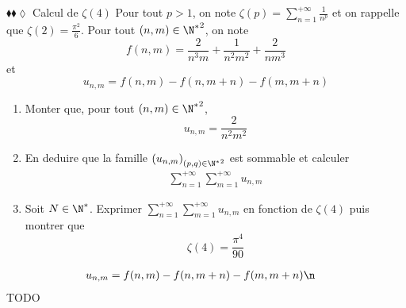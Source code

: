 \documentclass[11pt]{article}
\begin{document}
\begin{exercice}{$\blacklozenge\blacklozenge\lozenge$ Calcul de $\zeta(4)$}{}
    Pour tout $p > 1$, on note $\zeta(p) = \sum_{n=1}^{+\infty}\frac{1}{n^p}$ et on rappelle que $\zeta(2) = \frac{\pi^2}{6}$.\n
    Pour tout $(n, m) \in {\N^{*}}^{2}$, on note
    \begin{equation*}
        f(n, m) = \frac{2}{n^{3}m} + \frac{1}{n^{2}m^{2}} + \frac{2}{nm^{3}}
    \end{equation*}
    et
    \begin{equation*}
        u_{n, m} = f(n, m) - f(n, m + n) - f(m, m + n)
    \end{equation*}
    
    \begin{enumerate}
        \item Monter que, pour tout $(n, m) \in {\N^{*}}^{2}$, 
        \begin{equation*}
            u_{n, m} = \frac{2}{n^{2}m^{2}}
        \end{equation*}
        \item En deduire que la famille $\left( u_{n, m} \right)_{(p, q)\in {\N^{*}}^{2}}$ est sommable et calculer 
        \begin{align*}
            \sum_{n=1}^{+\infty} \sum_{m=1}^{+\infty} u_{n, m}
        \end{align*}
        \item Soit $N \in \N^{*}$. Exprimer $\sum_{n=1}^{+\infty} \sum_{m=1}^{+\infty} u_{n, m}$ en fonction de $\zeta(4)$ puis montrer que 
        \begin{equation*}
            \zeta(4) = \frac{\pi^{4}}{90}
        \end{equation*}
    \end{enumerate}

    \tcblower
    \begin{align*}
        u_{n, m} &= f(n, m) - f(n, m + n) - f(m, m + n) \n
    \end{align*}
    \Huge\centering TODO 
\end{exercice}
\end{document}

